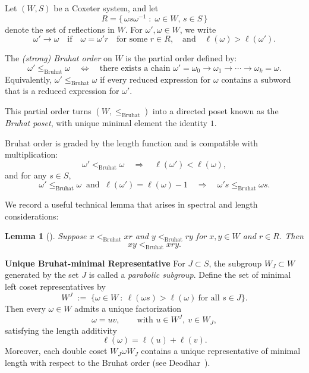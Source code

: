 \documentclass[11pt]{amsart}
\numberwithin{equation}{section}
\newtheorem{lem}[thm]{Lemma}
\begin{document}
Let $(W,S)$ be a Coxeter system, and let
\[
R = \{\, \omega s \omega^{-1} \;:\; \omega \in W,\, s \in S \,\}
\]
denote the set of reflections in $W$.
For $\omega', \omega \in W$, we write
\[
\omega' \rightarrow \omega
\quad \text{if} \quad
\omega = \omega' r \quad \text{for some } r \in R,
\quad \text{and} \quad
\ell(\omega) > \ell(\omega').
\]

The \emph{(strong) Bruhat order} on $W$ is the partial order defined by:
\[
\omega' \le_{\text{Bruhat}} \omega
\quad \Longleftrightarrow \quad
\text{there exists a chain }
\omega'=\omega_0 \rightarrow \omega_1 \rightarrow \cdots \rightarrow \omega_k = \omega.
\]
Equivalently, $\omega' \le_{\text{Bruhat}} \omega$ if every reduced expression for $\omega$ contains a subword that is a reduced expression for $\omega'$.

\medskip
This partial order turns $(W, \le_{\text{Bruhat}})$ into a directed poset known as the \emph{Bruhat poset}, with unique minimal element the identity $1$.

\medskip
Bruhat order is graded by the length function and is compatible with multiplication:
\[
\omega' <_{\text{Bruhat}} \omega
\quad \Rightarrow \quad
\ell(\omega') < \ell(\omega),
\]
and for any $s \in S$,
\[
\omega' \le_{\text{Bruhat}} \omega
\ \text{ and }\
\ell(\omega') = \ell(\omega) - 1
\quad \Rightarrow \quad
\omega' s \le_{\text{Bruhat}} \omega s.
\]

We record a useful technical lemma that arises in spectral and length considerations:

\begin{lem}[{\cite[Lemma~2.2.10]{BjornerBrenti}}]
Suppose $x <_{\text{Bruhat}} x r$ and $y <_{\text{Bruhat}} r y$ for $x,y \in W$ and $r \in R$. Then
\[
xy <_{\text{Bruhat}} x r y.
\]
\end{lem}

\noindent\textbf{Unique Bruhat-minimal Representative} For $J \subset S$, the subgroup $W_J \subset W$ generated by the set $J$ is called a \emph{parabolic subgroup}. Define the set of minimal left coset representatives by
\[ W^J \;:=\; \{ \omega \in W\ :\ \ell(\omega s)>\ell(\omega) \ \text{for all } s \in J \}.\]
Then every $\omega \in W$ admits a unique factorization \[ \omega = uv, \qquad \text{with  }u \in W^J,\ v \in W_J,\]
satisfying the length additivity 
\[\ell(\omega) = \ell(u)+\ell(v).\] Moreover, each double coset $W_J \omega W_J$ contains a unique representative of minimal length with respect to the Bruhat order (see Deodhar~\cite{Deodhar1987}).
\end{document}
